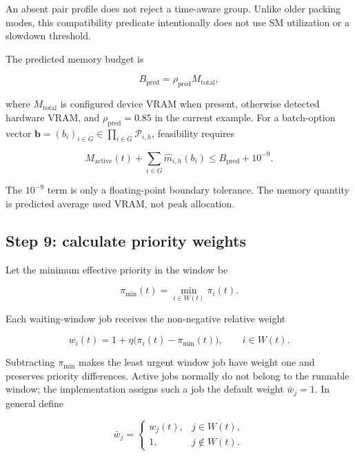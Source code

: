 \documentclass[11pt]{article}
\begin{document}
An absent pair profile does not reject a time-aware group.  Unlike older
packing modes, this compatibility predicate intentionally does not use SM
utilization or a slowdown threshold.

The predicted memory budget is

\begin{equation}
  B_{\mathrm{pred}}
  =\rho_{\mathrm{pred}}M_{\mathrm{total}},
  \label{eq:predicted-budget}
\end{equation}

where $M_{\mathrm{total}}$ is configured device VRAM when present, otherwise
detected hardware VRAM, and $\rho_{\mathrm{pred}}=0.85$ in the current example.
For a batch-option vector
$\boldsymbol b=(b_i)_{i\in G}\in\prod_{i\in G}\mathcal P_{i,h}$, feasibility
requires

\begin{equation}
  M_{\mathrm{active}}(t)
  +\sum_{i\in G}\widehat m_{i,h}(b_i)
  \le B_{\mathrm{pred}}+10^{-9}.
  \label{eq:memory-feasibility}
\end{equation}

The $10^{-9}$ term is only a floating-point boundary tolerance.  The memory
quantity is predicted average used VRAM, not peak allocation.

\subsection{Step 9: calculate priority weights}

Let the minimum effective priority in the window be

\begin{equation}
  \pi_{\min}(t)=\min_{i\in W(t)}\pi_i(t).
\end{equation}

Each waiting-window job receives the non-negative relative weight

\begin{equation}
  w_i(t)=1+\eta\bigl(\pi_i(t)-\pi_{\min}(t)\bigr),
  \qquad i\in W(t).
  \label{eq:priority-weight}
\end{equation}

Subtracting $\pi_{\min}$ makes the least urgent window job have weight one and
preserves priority differences.  Active jobs normally do not belong to the
runnable window; the implementation assigns such a job the default weight
$\bar w_j=1$.  In general define

\begin{equation}
  \bar w_j=
  \begin{cases}
    w_j(t), & j\in W(t),\\
    1, & j\notin W(t).
  \end{cases}
  \label{eq:active-weight}
\end{equation}
\end{document}
